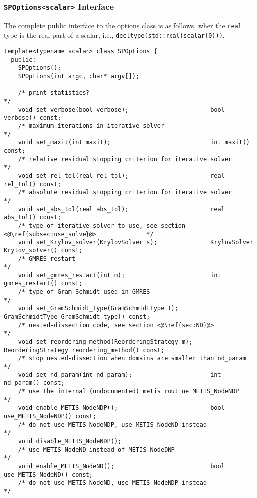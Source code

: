 \documentclass{article}
\begin{document}
\subsubsection{\lstinline[style=C]!SPOptions<scalar>! Interface}
\label{sec:SPOptions}
The complete public interface to the options class is as follows, wher
the \lstinline[style=C]!real! type is the real part of a scalar, i.e.,
\lstinline[style=C]!decltype(std::real(scalar(0)))!.
\begin{lstlisting}[style=C]
  template<typename scalar> class SPOptions {
  public:
    SPOptions();
    SPOptions(int argc, char* argv[]);

    /* print statistics?                                             */
    void set_verbose(bool verbose);                       bool verbose() const;
    /* maximum iterations in iterative solver                        */
    void set_maxit(int maxit);                            int maxit() const;
    /* relative residual stopping criterion for iterative solver     */
    void set_rel_tol(real rel_tol);                       real rel_tol() const;
    /* absolute residual stopping criterion for iterative solver     */
    void set_abs_tol(real abs_tol);                       real abs_tol() const;
    /* type of iterative solver to use, see section <@\ref{subsec:use_solve}@>              */
    void set_Krylov_solver(KrylovSolver s);               KrylovSolver Krylov_solver() const;
    /* GMRES restart                                                 */
    void set_gmres_restart(int m);                        int gmres_restart() const;
    /* type of Gram-Schmidt used in GMRES                            */
    void set_GramSchmidt_type(GramSchmidtType t);         GramSchmidtType GramSchmidt_type() const;
    /* nested-dissection code, see section <@\ref{sec:ND}@>                     */
    void set_reordering_method(ReorderingStrategy m);     ReorderingStrategy reordering_method() const;
    /* stop nested-dissection when domains are smaller than nd_param */
    void set_nd_param(int nd_param);                      int nd_param() const;
    /* use the internal (undocumented) metis routine METIS_NodeNDP   */
    void enable_METIS_NodeNDP();                          bool use_METIS_NodeNDP() const;
    /* do not use METIS_NodeNDP, use METIS_NodeND instead            */
    void disable_METIS_NodeNDP();
    /* use METIS_NodeND instead of METIS_NodeDNP                     */
    void enable_METIS_NodeND();                           bool use_METIS_NodeND() const;
    /* do not use METIS_NodeND, use METIS_NodeNDP instead            */

\end{lstlisting}
\end{document}
